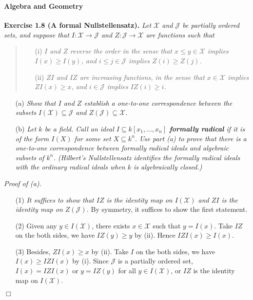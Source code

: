 \documentclass{article}
\begin{document}



\textbf{\large Algebra and Geometry} \\\\



\textbf{Exercise 1.8 (A formal Nullstellensatz).}
\emph{Let $\mathcal{X}$ and $\mathcal{J}$ be partially ordered sets,
and suppose that $I: \mathcal{X} \to \mathcal{J}$ and $Z: \mathcal{J} \to \mathcal{X}$
are functions such that}
\begin{quote}
  \begin{enumerate}
  \item[(i)]
  \emph{$I$ and $Z$ reverse the order in the sense that $x \leq y \in \mathcal{X}$
  implies $I(x) \geq I(y)$, and $i \leq j \in \mathcal{J}$ implies $Z(i) \geq Z(j)$.}
  \item[(ii)]
  \emph{$ZI$ and $IZ$ are increasing functions, in the sense that
  $x \in \mathcal{X}$ implies $ZI(x) \geq x$,
  and $i \in \mathcal{J}$ implies $IZ(i) \geq i$.}
  \end{enumerate}
\end{quote}
\begin{enumerate}
\item[(a)]
  \emph{Show that $I$ and $Z$ establish a one-to-one correspondence between
  the subsets $I(\mathcal{X}) \subseteq \mathcal{J}$ and $Z(\mathcal{J}) \subseteq \mathcal{X}$.}
\item[(b)]
  \emph{Let $k$ be a field.
  Call an ideal $I \subseteq k[x_1,\ldots,x_n]$ \textbf{formally radical}
  if it is of the form $I(X)$ for some set $X \subseteq k^n$.
  Use part (a) to prove that there is a one-to-one correspondence between
  formally radical ideals and algebraic subsets of $k^n$.
  (Hilbert's Nullstellensatz identifies the formally radical ideals
  with the ordinary radical ideals when $k$ is algebraically closed.)} \\
\end{enumerate}

\emph{Proof of (a).}
\begin{enumerate}
  \item[(1)]
  \emph{It suffices to show that $IZ$ is the identity map on $I(\mathcal{X})$
  and $ZI$ is the identity map on $Z(\mathcal{J})$.}
  By symmetry, it suffices to show the first statement.
  \item[(2)]
  Given any $y \in I(\mathcal{X})$, there exists $x \in \mathcal{X}$ such that $y = I(x)$.
  Take $IZ$ on the both sides, we have $IZ(y) \geq y$ by (ii).
  Hence $IZI(x) \geq I(x)$.
  \item[(3)]
  Besides, $ZI(x) \geq x$ by (ii). Take $I$ on the both sides,
  we have $I(x) \geq IZI(x)$ by (i).
  Since $\mathcal{J}$ is a partially ordered set,
  $I(x) = IZI(x)$
  or $y = IZ(y)$ for all $y \in I(\mathcal{X})$,
  or $IZ$ is the identity map on $I(\mathcal{X})$.
\end{enumerate}
$\Box$ \\
\end{document}
